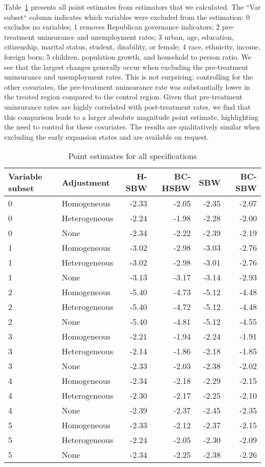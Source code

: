 Table~\ref{tab:ptests} presents all point estimates from estimators that we calculated. The ``Var subset`` column indicates which variables were excluded from the estimation: 0 excludes no variables; 1 removes Republican governance indicators; 2 pre-treatment uninsurance and unemployment rates; 3 urban, age, education, citizenship, marital status, student, disability, or female; 4 race, ethnicity, income, foreign born; 5 children, population growth, and household to person ratio. We see that the largest changes generally occur when excluding the pre-treatment uninsurance and unemployment rates. This is not surprising: controlling for the other covariates, the pre-treatment uninsurance rate was substantially lower in the treated region compared to the control region. Given that pre-treatment uninsurance rates are highly correlated with post-treatment rates, we find that this comparison leads to a larger absolute magnitude point estimate, highlighting the need to control for these covariates. The results are qualitatively similar when excluding the early expansion states and are available on request.

\begin{table}[h!]
\centering
\caption{Point estimates for all specifications}
\label{tab:ptests}
\begin{tabular}{llrrrr}
  \hline
Variable subset & Adjustment & H-SBW & BC-HSBW & SBW & BC-SBW \\ 
  \hline
0 & Homogeneous & -2.33 & -2.05 & -2.35 & -2.07 \\ 
  0 & Heterogeneous & -2.24 & -1.98 & -2.28 & -2.00 \\ 
  0 & None & -2.34 & -2.22 & -2.39 & -2.19 \\ 
  1 & Homogeneous & -3.02 & -2.98 & -3.03 & -2.76 \\ 
  1 & Heterogeneous & -3.02 & -2.98 & -3.01 & -2.76 \\ 
  1 & None & -3.13 & -3.17 & -3.14 & -2.93 \\ 
  2 & Homogeneous & -5.40 & -4.73 & -5.12 & -4.48 \\ 
  2 & Heterogeneous & -5.40 & -4.72 & -5.12 & -4.48 \\ 
  2 & None & -5.40 & -4.81 & -5.12 & -4.55 \\ 
  3 & Homogeneous & -2.21 & -1.94 & -2.24 & -1.91 \\ 
  3 & Heterogeneous & -2.14 & -1.86 & -2.18 & -1.85 \\ 
  3 & None & -2.33 & -2.03 & -2.38 & -2.02 \\ 
  4 & Homogeneous & -2.34 & -2.18 & -2.29 & -2.15 \\ 
  4 & Heterogeneous & -2.30 & -2.17 & -2.25 & -2.10 \\ 
  4 & None & -2.39 & -2.37 & -2.45 & -2.35 \\ 
  5 & Homogeneous & -2.33 & -2.12 & -2.37 & -2.15 \\ 
  5 & Heterogeneous & -2.24 & -2.05 & -2.30 & -2.09 \\ 
  5 & None & -2.34 & -2.25 & -2.38 & -2.26 \\ 
   \hline
\end{tabular}
\end{table}

